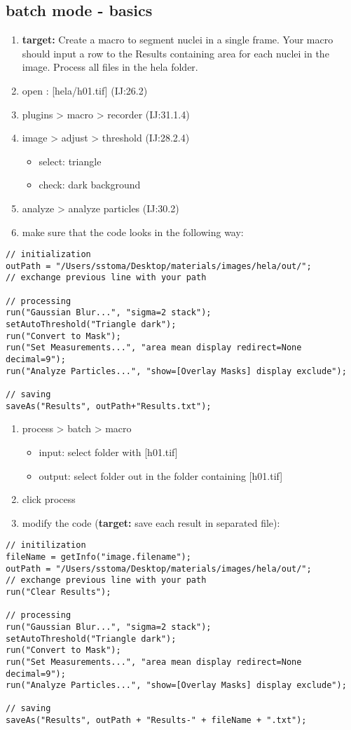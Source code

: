 \documentclass[11pt]{article}
\begin{document}
\subsection{batch mode - basics}
\label{sec-7-9}
\begin{enumerate}
\item \textbf{target:} Create a macro to segment nuclei in a single
frame. Your macro should input a row to the Results containing
area for each nuclei in the image. Process all files in the hela
folder.
\item open : [hela/h01.tif] (IJ:26.2)
\item plugins > macro > recorder (IJ:31.1.4)
\item image > adjust > threshold (IJ:28.2.4)
\begin{itemize}
\item select: triangle
\item check: dark background
\end{itemize}
\item analyze > analyze particles  (IJ:30.2)
\item make sure that the code looks in the following way:
\end{enumerate}
\begin{verbatim}
// initialization
outPath = "/Users/sstoma/Desktop/materials/images/hela/out/"; 
// exchange previous line with your path

// processing
run("Gaussian Blur...", "sigma=2 stack");
setAutoThreshold("Triangle dark");
run("Convert to Mask");
run("Set Measurements...", "area mean display redirect=None decimal=9");
run("Analyze Particles...", "show=[Overlay Masks] display exclude");

// saving
saveAs("Results", outPath+"Results.txt");
\end{verbatim}
\begin{enumerate}
\item process > batch > macro
\begin{itemize}
\item input: select folder with [h01.tif]
\item output: select folder out in the folder containing [h01.tif]
\end{itemize}
\item click process

\item modify the code (\textbf{target:} save each result in separated file):
\end{enumerate}
\begin{verbatim}
// initilization
fileName = getInfo("image.filename");
outPath = "/Users/sstoma/Desktop/materials/images/hela/out/"; 
// exchange previous line with your path
run("Clear Results");

// processing
run("Gaussian Blur...", "sigma=2 stack");
setAutoThreshold("Triangle dark");
run("Convert to Mask");
run("Set Measurements...", "area mean display redirect=None decimal=9");
run("Analyze Particles...", "show=[Overlay Masks] display exclude");

// saving
saveAs("Results", outPath + "Results-" + fileName + ".txt");
\end{verbatim}
\end{document}

